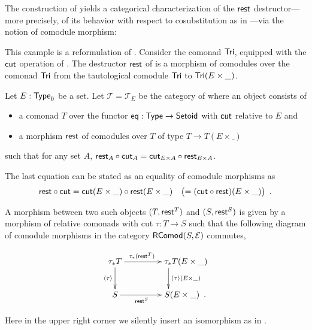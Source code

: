 \documentclass[envcountsame]{llncs}
\begin{document}
\begin{Long}
The construction of  yields a categorical characterization of the $\mathsf{rest}$ destructor---%
more precisely, of its behavior with respect to cosubstitution as in ---via the notion of comodule morphism:


\begin{example}\label{ex:tail_comodule_alternative}
This example is a reformulation of .
 Consider the comonad $\mathsf{Tri}$, equipped with the $\mathsf{cut}$ operation of .
 The destructor $\mathsf{rest}$ of  is a morphism of comodules over the comonad $\mathsf{Tri}$ 
  from the tautological comodule  $\mathsf{Tri}$ to $\mathsf{Tri}(E\times \_)$.
  
\end{example}
\end{Long}


\begin{definition}%
\label{def:cat_tri}
   Let $E:\mathsf{Type}_0$ be a set.
   Let $\mathcal{T} = \mathcal{T}_E$ be the category of  where an object consists of
   \begin{itemize}
    \item a comonad $T$ over the functor $\mathsf{eq}:\mathsf{Type}\to\mathsf{Setoid}$ with $\mathsf{cut}$ relative to $E$ and
    \item a morphism $\mathsf{rest}$ of comodules over $T$ of type $T \to T(E\times \_)$
   \end{itemize}
   such that for any set $A$,
    $ {\mathsf{rest}_A} \circ {\ensuremath{\mathsf{cut}}_A} = {\mathsf{cut}_{E\times A}} \circ {\ensuremath{\mathsf{rest}}_{E\times A}}$.
    
 \begin{Long}
   The last equation can be stated as an equality of comodule morphisms as
     \[ {\mathsf{rest}} \circ {\ensuremath{\mathsf{cut}}} = {\mathsf{cut}(E\times\_)} \circ {\ensuremath{\mathsf{rest}}(E\times \_)} \quad \bigl( = ({\mathsf{cut}} \circ {\ensuremath{\mathsf{rest}}})(E\times \_)\bigr)\enspace . \]
\end{Long}
  
   
   A morphism between two such objects $(T,\mathsf{rest}^T)$ and $(S,\mathsf{rest}^S)$
   is given by a morphism of relative comonads with cut $\tau : T \to S$ such that
   the following diagram of comodule morphisms in the category $\mathsf{RComod}(S,\mathcal{E})$ commutes,
   
   \[ \begin{xy}
       \xymatrix{   \tau_*T  \ar[r]^{\tau_*(\tail^T)} \ar[d]_{\induced{\tau}}  &  **[r] \tau_*T (E\times \_ )\ar[d]^{\induced{\tau}(E\times \_)} \\
                    S  \ar[r]_{\tail^S}  &  **[r] S (E\times \_ ) \enspace .
        }
      \end{xy}
   \]

   \noindent
   Here in the upper right corner we silently insert an isomorphism as in .
\end{definition}   
   
\end{document}
